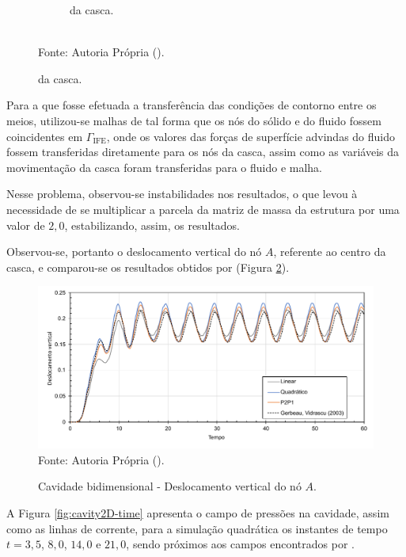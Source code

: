 \begin{figure}[h!]
\begin{subfigure}[b]{0.32\textwidth}
        \caption{da casca.}
    \end{subfigure}
    \\Fonte: Autoria Própria (\the\year).
    \label{fig:Cavity2D-mesh}
\end{figure}

Para a que fosse efetuada a transferência das condições de contorno entre os meios, utilizou-se malhas de tal forma que os nós do sólido e do fluido fossem coincidentes em $\Gamma_\mathrm{IFE}$, onde os valores das forças de superfície advindas do fluido fossem transferidas diretamente para os nós da casca, assim como as variáveis da movimentação da casca foram transferidas para o fluido e malha.

Nesse problema, observou-se instabilidades nos resultados, o que levou à necessidade de se multiplicar a parcela da matriz de massa da estrutura por uma valor de $2,0$, estabilizando, assim, os resultados.

Observou-se, portanto o deslocamento vertical do nó $A$, referente ao centro da casca, e comparou-se os resultados obtidos por  (Figura \ref{fig:cavity2D-res}).

\begin{figure}[h!]
    \centering
    \caption{Cavidade bidimensional - Deslocamento vertical do nó $A$.}
    \includegraphics[width=\linewidth]{Figuras/FSI-Cavity2D/resultados.pdf}
    \\Fonte: Autoria Própria (\the\year).
    \label{fig:cavity2D-res}
\end{figure}

A Figura \ref{fig:cavity2D-time} apresenta o campo de pressões na cavidade, assim como as linhas de corrente, para a simulação quadrática os instantes de tempo $t=3,5$, $8,0$, $14,0$ e $21,0$, sendo próximos aos campos encontrados por .

